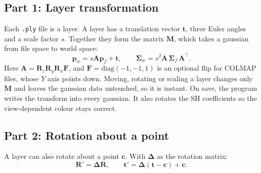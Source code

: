 \documentclass[9pt,twocolumn,a4paper]{extarticle}
\newcommand{\code}[1]{\texttt{#1}}
\newcommand{\Sig}{\symbf{\Sigma}}
\begin{document}
\subsection{Part 1: Layer transformation}
\label{sec:layers}
Each \code{.ply} file is a layer. A layer has a translation vector $\mathbf{t}$, three Euler angles and a scale factor $s$. Together they form the matrix $\mathbf{M}$, which takes a gaussian from file space to world space:
\begin{equation}
\mathbf{p}_w=s\mathbf{A}\mathbf{p}_f+\mathbf{t},\qquad
\Sig_w=s^{2}\mathbf{A}\,\Sig_f\,\mathbf{A}^{\top}.
\label{eq:world}
\end{equation}
Here $\mathbf{A}=\mathbf{R}_z\mathbf{R}_y\mathbf{R}_x\mathbf{F}$, and $\mathbf{F}=\mathrm{diag}(-1,-1,1)$ is an optional flip for COLMAP files, whose $Y$ axis points down. Moving, rotating or scaling a layer changes only $\mathbf{M}$ and leaves the gaussian data untouched, so it is instant. On save, the program writes the transform into every gaussian. It also rotates the SH coefficients so the view-dependent colour stays correct.

\par\noindent{}\par\vspace{3pt}

\subsection{Part 2: Rotation about a point}
A layer can also rotate about a point $\mathbf{c}$. With $\symbf{\Delta}$ as the rotation matrix:
\begin{equation}
\mathbf{R}'=\symbf{\Delta}\mathbf{R},\qquad \mathbf{t}'=\symbf{\Delta}(\mathbf{t}-\mathbf{c})+\mathbf{c}.
\end{equation}

\par\noindent{}\par\vspace{3pt}

\end{document}
